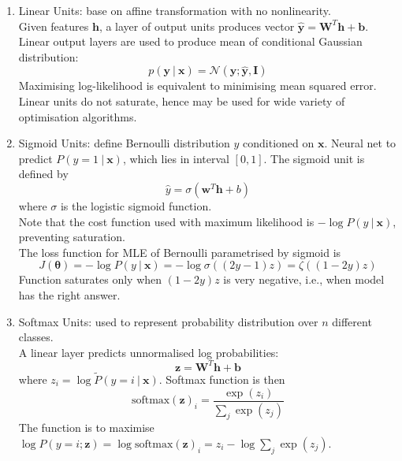 \begin{definition} 
\begin{enumerate}[label=\roman*.]
\setlength{\itemsep}{0pt}
\item Linear Units: base on affine transformation with no nonlinearity.\\
Given features $\bm{h}$, a layer of output units produces vector $\hat{\bm{y}} = \bm{W}^T \bm{h} + \bm{b}$. Linear output layers are used to produce mean of conditional Gaussian distribution:
\begin{equation}
p(\bm{y} \ \vert \ \bm{x}) = \mathcal{N}(\bm{y}; \hat{\bm{y}}, \bm{I}) \nonumber
\end{equation}
Maximising log-likelihood is equivalent to minimising mean squared error.\\
Linear units do not saturate, hence may be used for wide variety of optimisation algorithms.
\item Sigmoid Units: define Bernoulli distribution $y$ conditioned on $\bm{x}$. Neural net to predict $P(y = 1 \ \vert \ \bm{x})$, which lies in interval $[0,1]$. The sigmoid unit is defined by
\begin{equation}
\hat{y} = \sigma(\bm{w}^T \bm{h} + b) \nonumber
\end{equation}
where $\sigma$ is the logistic sigmoid function.\\
Note that the cost function used with maximum likelihood is $- \log P(y \ \vert \ \bm{x})$, preventing saturation.\\
The loss function for MLE of Bernoulli parametrised by sigmoid is
\begin{equation}
J(\bm{\theta}) = - \log P(y \ \vert \ \bm{x}) = - \log \sigma((2y - 1)z) = \zeta((1-2y)z) \nonumber
\end{equation}
Function saturates only when $(1-2y)z$ is very negative, i.e., when model has the right answer.
\item Softmax Units: used to represent probability distribution over $n$ different classes.\\
A linear layer predicts unnormalised log probabilities:
\begin{equation}
\bm{z} = \bm{W}^T \bm{h} + \bm{b} \nonumber
\end{equation}
where $z_i = \log \tilde{P}(y=i \ \vert \ \bm{x})$. Softmax function is then
\begin{equation}
\text{softmax}(\bm{z})_i = \frac{\exp(z_i)}{\sum_j \exp(z_j)} \nonumber
\end{equation}
The function is to maximise $\log P(y=i ; \bm{z}) = \log \text{softmax}(\bm{z})_i = z_i - \log \sum_{j} \exp(z_j)$.\\

\end{enumerate}
\end{definition}
